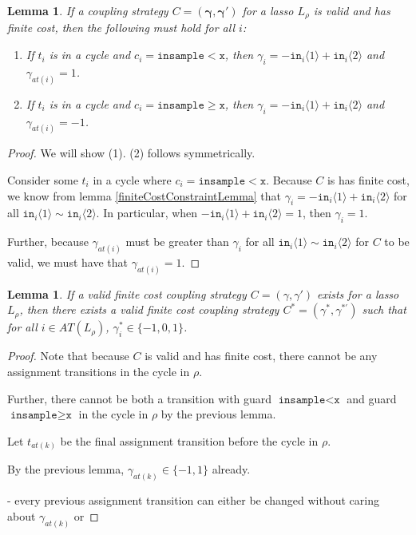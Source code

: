 \documentclass[12pt]{article}
\newcommand{\gguard}[1][x]{\texttt{insample}\geq #1}
\newcommand{\lguard}[1][x]{\texttt{insample} < #1}
\newcommand{\brangle}[1]{\langle #1 \rangle}
\newtheorem{lemma}[thm]{Lemma}
\theoremstyle{definition}
\begin{document}
\begin{lemma}\label{cycleGammaConstraints}
    If a coupling strategy $C=(\mathbf{\gamma}, \mathbf{\gamma}')$ for a lasso $L_\rho$ is valid and has finite cost, then the following must hold for all $i$:
    \begin{enumerate}
        \item If $t_i$ is in a cycle and $c_i = \lguard[\texttt{x}]$, then $\gamma_i = -\texttt{in}_i\brangle{1}+\texttt{in}_i\brangle{2}$ and $\gamma_{at(i)} = 1$.
        \item If $t_i$ is in a cycle and $c_i = \gguard[\texttt{x}]$, then $\gamma_i = -\texttt{in}_i\brangle{1}+\texttt{in}_i\brangle{2}$ and $\gamma_{at(i)} = -1$.
    \end{enumerate}
\end{lemma}
\begin{proof}
    We will show (1). (2) follows symmetrically.

    Consider some $t_i$ in a cycle where $c_i = \lguard[\texttt{x}]$. Because $C$ is has finite cost, we know from lemma \ref{finiteCostConstraintLemma} that $\gamma_i = -\texttt{in}_i\brangle{1}+\texttt{in}_i\brangle{2}$ for all  $\texttt{in}_i\brangle{1}\sim\texttt{in}_i\brangle{2}$. In particular, when $-\texttt{in}_i\brangle{1}+\texttt{in}_i\brangle{2}=1$, then $\gamma_i=1$. 
    
    Further, because $\gamma_{at(i)}$ must be greater than $\gamma_i$ for all $\texttt{in}_i\brangle{1}\sim\texttt{in}_i\brangle{2}$ for $C$ to be valid, we must have that $\gamma_{at(i)}=1$.
\end{proof}
\begin{lemma}
    If a valid finite cost coupling strategy $C = (\gamma, \gamma')$ exists for a lasso $L_\rho$, then there exists a valid finite cost coupling strategy $C^*= (\gamma^*, \gamma^{*\prime})$ such that for all $i\in AT(L_\rho)$, $\gamma_i^*\in \{-1, 0, 1\}$. 
\end{lemma}
\begin{proof}
    Note that because $C$ is valid and has finite cost, there cannot be any assignment transitions in the cycle in $\rho$. 

    Further, there cannot be both a transition with guard $\lguard[\texttt{x}]$ and guard $\gguard[\texttt{x}]$ in the cycle in $\rho$ by the previous lemma. 

    Let $t_{at(k)}$ be the final assignment transition before the cycle in $\rho$. 

    By the previous lemma, $\gamma_{at(k)} \in \{-1, 1\}$ already. 

    - every previous assignment transition can either be changed without caring about $\gamma_{at(k)}$ or 

\end{proof}
\end{document}
